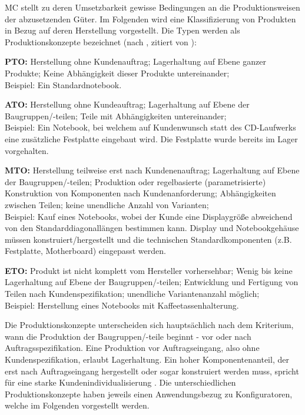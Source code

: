 \documentclass[12pt,a4paper,bibliography=totocnumbered,listof=totoc]{scrartcl}
\begin{document}
\ac{MC} stellt zu deren Umsetzbarkeit gewisse Bedingungen an die Produktionsweisen der abzusetzenden Güter. Im Folgenden wird eine Klassifizierung von Produkten in Bezug auf deren Herstellung vorgestellt. Die Typen werden als Produktionskonzepte bezeichnet  (nach \citealt{schuh06}, zitiert von \citealt{lutz11}):
\begin{compactitem}
	\item \textbf{\ac{PTO}:} Herstellung ohne Kundenauftrag; Lagerhaltung auf Ebene ganzer Produkte; Keine Abhängigkeit dieser Produkte untereinander;\\
	Beispiel: Ein Standardnotebook.
	\item \textbf{\ac{ATO}:} Herstellung ohne Kundeauftrag; Lagerhaltung auf Ebene der Baugruppen/-teilen; Teile mit Abhängigkeiten untereinander;\\
	Beispiel: Ein Notebook, bei welchem auf Kundenwunsch statt des CD-Laufwerks eine zusätzliche Festplatte eingebaut wird. Die Festplatte wurde bereits im Lager vorgehalten.
	\item \textbf{\ac{MTO}:} Herstellung teilweise erst nach Kundenenauftrag; Lagerhaltung auf Ebene der Baugruppen/-teilen; Produktion oder regelbasierte (parametrisierte) Konstruktion von Komponenten nach Kundenanforderung; Abhängigkeiten zwischen Teilen; keine unendliche Anzahl von Varianten;\\
		Beispiel: Kauf eines Notebooks, wobei der Kunde eine Displaygröße abweichend von den Standarddiagonallängen bestimmen kann. Display und Notebookgehäuse müssen konstruiert/hergestellt und die technischen Standardkomponenten (z.B. Festplatte, Motherboard) eingepasst werden. 
	\item \textbf{\ac{ETO}:} Produkt ist nicht komplett vom Hersteller vorhersehbar; Wenig bis keine Lagerhaltung auf Ebene der Baugruppen/-teilen; Entwicklung und Fertigung von Teilen nach Kundenspezifikation; unendliche Variantenanzahl möglich;\\
	Beispiel: Herstellung eines Notebooks mit Kaffeetassenhalterung.
\end{compactitem}

Die Produktionskonzepte unterscheiden sich hauptsächlich nach dem Kriterium, wann die Produktion der Baugruppen/-teile beginnt - vor oder nach Auftragsspezifikation. Eine Produktion vor Auftragseingang, also ohne Kundenspezifikation, erlaubt Lagerhaltung. Ein hoher Komponentenanteil, der erst nach Auftragseingang hergestellt oder sogar konstruiert werden muss, spricht für eine starke Kundenindividualisierung \citep{lutz11}. Die unterschiedlichen Produktionskonzepte haben jeweils einen Anwendungsbezug zu Konfiguratoren, welche im Folgenden vorgestellt werden.
\end{document}
